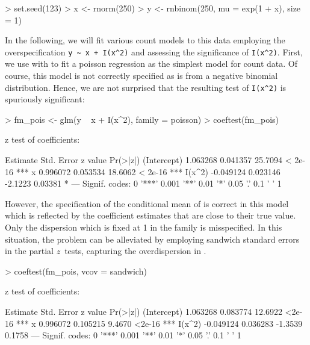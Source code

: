 \documentclass{Z}
\begin{document}
\begin{Schunk}
\begin{Sinput}
> set.seed(123)
> x <- rnorm(250)
> y <- rnbinom(250, mu = exp(1 + x), size = 1)
\end{Sinput}
\end{Schunk}

In the following, we will fit various count models to this data employing
the overspecification \verb/y ~ x + I(x^2)/ and assessing the significance
of \verb/I(x^2)/. First, we use  with 
to fit a poisson regression as the simplest model for count data.
Of course, this model is not correctly specified as  is from a 
negative binomial distribution. Hence, we are not surprised that the 
resulting test of \verb/I(x^2)/ is spuriously significant:

\begin{Schunk}
\begin{Sinput}
> fm_pois <- glm(y ~ x + I(x^2), family = poisson)
> coeftest(fm_pois)
\end{Sinput}
\begin{Soutput}
z test of coefficients:

             Estimate Std. Error z value Pr(>|z|)    
(Intercept)  1.063268   0.041357 25.7094  < 2e-16 ***
x            0.996072   0.053534 18.6062  < 2e-16 ***
I(x^2)      -0.049124   0.023146 -2.1223  0.03381 *  
---
Signif. codes:  0 '***' 0.001 '**' 0.01 '*' 0.05 '.' 0.1 ' ' 1 
\end{Soutput}
\end{Schunk}

However, the specification of the conditional mean of  is correct
in this model which is reflected by the coefficient estimates that are close to 
their true value. Only the dispersion which is fixed at 1 in the 
family is misspecified. In this situation, the problem can be alleviated 
by employing sandwich standard errors in the partial $z$~tests, capturing
the overdispersion in .

\begin{Schunk}
\begin{Sinput}
> coeftest(fm_pois, vcov = sandwich)
\end{Sinput}
\begin{Soutput}
z test of coefficients:

             Estimate Std. Error z value Pr(>|z|)    
(Intercept)  1.063268   0.083774 12.6922   <2e-16 ***
x            0.996072   0.105215  9.4670   <2e-16 ***
I(x^2)      -0.049124   0.036283 -1.3539   0.1758    
---
Signif. codes:  0 '***' 0.001 '**' 0.01 '*' 0.05 '.' 0.1 ' ' 1 
\end{Soutput}
\end{Schunk}
\end{document}
